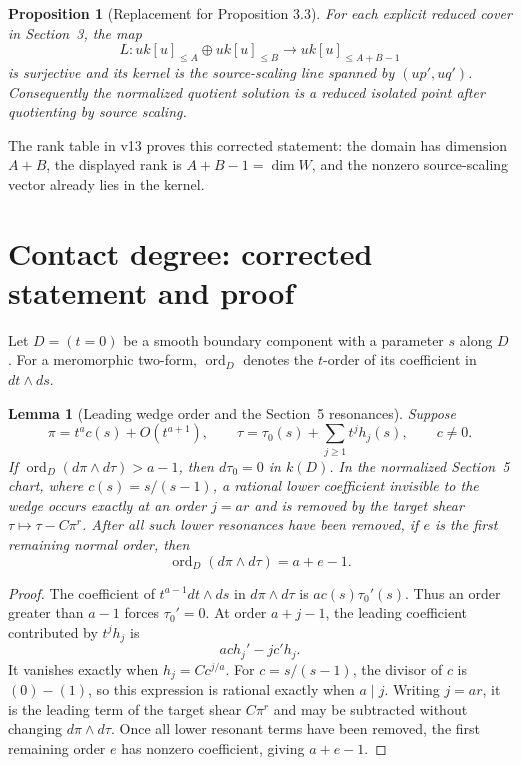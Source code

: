 \documentclass[11pt]{article}
\newtheorem{proposition}{Proposition}
\newtheorem{lemma}{Lemma}
\newcommand{\ord}{\operatorname{ord}}
\begin{document}
\begin{proposition}[Replacement for Proposition 3.3]
For each explicit reduced cover in Section~3, the map
\[
 L:u k[u]_{\le A}\oplus u k[u]_{\le B}
   \longrightarrow u k[u]_{\le A+B-1}
\]
is surjective and its kernel is the source-scaling line spanned by
$(up',uq')$.  Consequently the normalized quotient solution is a reduced
isolated point after quotienting by source scaling.
\end{proposition}

\noindent
The rank table in v13 proves this corrected statement: the domain has
dimension $A+B$, the displayed rank is $A+B-1=\dim W$, and the nonzero
source-scaling vector already lies in the kernel.

\section{Contact degree: corrected statement and proof}

Let $D=(t=0)$ be a smooth boundary component with a parameter $s$ along
$D$.  For a meromorphic two-form, $\ord_D$ denotes the $t$-order of its
coefficient in $dt\wedge ds$.

\begin{lemma}[Leading wedge order and the Section~5 resonances]
Suppose
\[
 \pi=t^a c(s)+O(t^{a+1}),\qquad
 \tau=\tau_0(s)+\sum_{j\ge1}t^j h_j(s),
 \qquad c\ne0.
\]
If $\ord_D(d\pi\wedge d\tau)>a-1$, then $d\tau_0=0$ in $k(D)$.
In the normalized Section~5 chart, where $c(s)=s/(s-1)$, a rational lower
coefficient invisible to the wedge occurs exactly at an order $j=ar$ and is
removed by the target shear $\tau\mapsto\tau-C\pi^r$.  After all such lower
resonances have been removed, if $e$ is the first remaining normal order,
then
\[
 \ord_D(d\pi\wedge d\tau)=a+e-1.
\]
\end{lemma}

\begin{proof}
The coefficient of $t^{a-1}dt\wedge ds$ in $d\pi\wedge d\tau$ is
$a c(s)\tau_0'(s)$.  Thus an order greater than $a-1$ forces
$\tau_0'=0$.  At order $a+j-1$, the leading coefficient contributed by
$t^jh_j$ is
\[
 a c h_j'-j c'h_j.
\]
It vanishes exactly when $h_j=Cc^{j/a}$.  For $c=s/(s-1)$, the divisor of
$c$ is $(0)-(1)$, so this expression is rational exactly when $a\mid j$.
Writing $j=ar$, it is the leading term of the target shear $C\pi^r$ and may
be subtracted without changing $d\pi\wedge d\tau$.  Once all lower
resonant terms have been removed, the first remaining order $e$ has nonzero
coefficient, giving $a+e-1$.
\end{proof}
\end{document}
